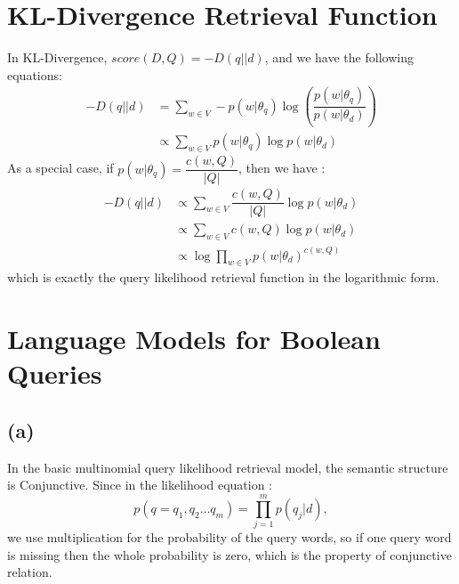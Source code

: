 

\oddsidemargin 0in
\evensidemargin 0in
\textwidth 6.5in
\topmargin -0.5in
\textheight 9.0in
\usepackage{amsmath}





\pagestyle{myheadings}  %

\section{KL-Divergence Retrieval Function}
In KL-Divergence, $score(D,Q) = -D(q||d)$, and we have the following equations:
\begin{align*}
-D(q||d) 
& = \sum_{w\in V} -p(w|\theta_q) \log{(\dfrac{ p(w|\theta_q)}{ p(w|\theta_d)})} \\
& \propto  \sum_{w\in V}p(w|\theta_q) \log{p(w|\theta_d)} 
\end{align*}
As a special case, if $p(w|\theta_q) = \dfrac{c(w,Q)}{|Q|}$, then we have :
\begin{align*}
-D(q||d) 
& \propto \sum_{w\in V} \dfrac{c(w,Q)}{|Q|} \log{p(w|\theta_d)}  \\
& \propto \sum_{w\in V} c(w,Q) \log{p(w|\theta_d)}  \\
& \propto \log{\prod _{w\in V}  p(w|\theta_d)}^{ c(w,Q)} 
\end{align*}
which is exactly the query likelihood retrieval function in the logarithmic form.

\section{Language Models for Boolean Queries}
\subsection*{(a)}
In the basic multinomial query likelihood retrieval model, the semantic structure is Conjunctive. Since in the likelihood equation : 
\begin{equation*}
p(q=q_1,q_2\dots q_m) = \prod_{j=1}^{m}p(q_j|d),
\end{equation*}
we use multiplication for the probability of the query words, so if one query word is missing then the whole probability is zero, which is the property of conjunctive relation.

